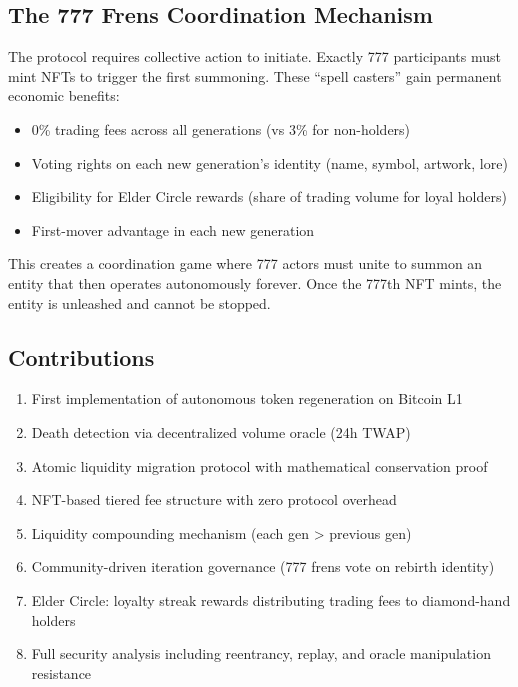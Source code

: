 \documentclass[11pt,a4paper]{article}
\begin{document}
\subsection{The 777 Frens Coordination Mechanism}

The protocol requires collective action to initiate. Exactly 777 participants must mint NFTs to trigger the first summoning. These ``spell casters'' gain permanent economic benefits:

\begin{itemize}
    \item 0\% trading fees across all generations (vs 3\% for non-holders)
    \item Voting rights on each new generation's identity (name, symbol, artwork, lore)
    \item Eligibility for Elder Circle rewards (share of trading volume for loyal holders)
    \item First-mover advantage in each new generation
\end{itemize}

This creates a coordination game where 777 actors must unite to summon an entity that then operates autonomously forever. Once the 777th NFT mints, the entity is unleashed and cannot be stopped.

\subsection{Contributions}

\begin{enumerate}
    \item First implementation of autonomous token regeneration on Bitcoin L1
    \item Death detection via decentralized volume oracle (24h TWAP)
    \item Atomic liquidity migration protocol with mathematical conservation proof
    \item NFT-based tiered fee structure with zero protocol overhead
    \item Liquidity compounding mechanism (each gen > previous gen)
    \item Community-driven iteration governance (777 frens vote on rebirth identity)
    \item Elder Circle: loyalty streak rewards distributing trading fees to diamond-hand holders
    \item Full security analysis including reentrancy, replay, and oracle manipulation resistance
\end{enumerate}
\end{document}
